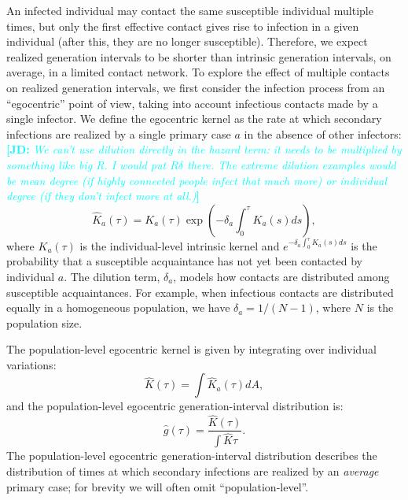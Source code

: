 \documentclass[12pt]{article}
\newcommand{\comment}[3]{\textcolor{#1}{\textbf{[#2: }\textsl{#3}\textbf{]}}}
\newcommand{\jd}[1]{\comment{cyan}{JD}{#1}}
\begin{document}
An infected individual may contact the same susceptible individual multiple times, but only the first effective contact gives rise to infection in a given individual (after this, they are no longer susceptible).
Therefore, we expect realized generation intervals to be shorter than intrinsic generation intervals, on average, in a limited contact network.
To explore the effect of multiple contacts on realized generation intervals, we first consider the infection process from an ``egocentric'' point of view, taking into account infectious contacts made by a single infector.
We define the egocentric kernel as the rate at which secondary infections are realized by a single primary case $a$ in the absence of other infectors:
\jd{We can't use dilution directly in the hazard term: it needs to be multiplied by something like big R. I would put $R\delta$ there. The extreme dilution examples would be mean degree (if highly connected people infect that much more) or individual degree (if they don't infect more at all.)}
\begin{equation}
\hat{K}_a(\tau) = K_a(\tau) \exp \left(- \delta_a \int_0^\tau K_a(s) ds\right),
\end{equation}
where $K_a(\tau)$ is the individual-level intrinsic kernel and $e^{- \delta_a \int_0^\tau K_a(s) ds}$ is the probability that a susceptible acquaintance has not yet been contacted by individual $a$.
The dilution term, $\delta_a$, models how contacts are distributed among susceptible acquaintances.
For example, when infectious contacts are distributed equally in a homogeneous population, we have $\delta_a = 1/(N-1)$, where $N$ is the population size.

The population-level egocentric kernel is given by integrating over individual variations:
\begin{equation}
\hat{K}(\tau) = \int \hat{K}_a(\tau) dA,
\end{equation}
and the population-level egocentric generation-interval distribution is:
\begin{equation}
\hat{g}(\tau) = \frac{\hat{K}(\tau)}{\int \hat{K} \tau}.
\label{eq:conditional}
\end{equation}
The population-level egocentric generation-interval distribution describes the distribution of times at which secondary infections are realized by an \emph{average} primary case; for brevity we will often omit ``population-level''.
\end{document}
